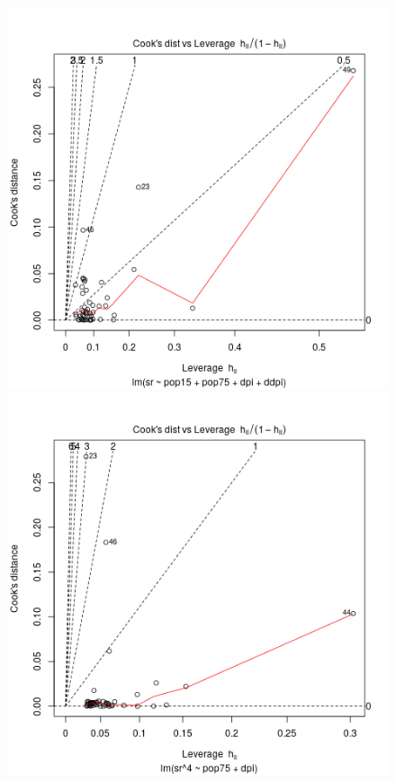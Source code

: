 \begin{figure}[p]
\begin{center}
    \includegraphics[scale=0.4]{plot16.png} \hspace*{2cm} \includegraphics[scale=0.4]{plot26.png} \\
  \end{center}
\end{figure}

